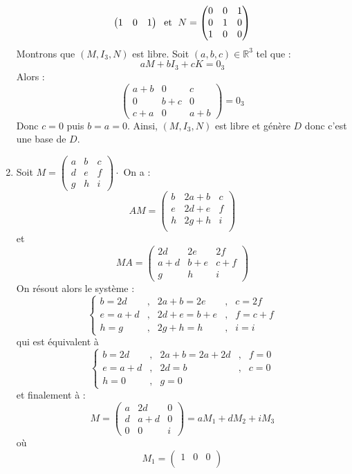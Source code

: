 \documentclass[a4paper,10pt]{report}
\begin{document}
\begin{enumerate}
$$\begin{pmatrix}
1 & 0 & 1
\end{pmatrix} \; \hbox{ et } \; N = \begin{pmatrix}
0 & 0 & 1 \\
0 & 1 & 0 \\
1 & 0 & 0 
\end{pmatrix}$$
Montrons que $(M,I_3,N)$ est libre. Soit $(a,b,c) \in \mathbb{R}^3$ tel que :
$$ a M + b I_3 + c K = 0_3$$
Alors :
$$ \begin{pmatrix}
a+b & 0 & c \\
0 & b+c & 0 \\
c+a & 0& a+b 
\end{pmatrix} = 0_3 $$
Donc $c=0$ puis $b=a=0$. Ainsi, $(M,I_3,N)$ est libre et génère $D$ donc c'est une base de $D$.
\item Soit $M = \begin{pmatrix}
a & b & c \\
d & e & f \\
g & h & i 
\end{pmatrix} \cdot$ On a :
$$ AM = \begin{pmatrix}
b & 2a+b & c\\
e & 2d+e & f \\
h & 2g+h & i \\
\end{pmatrix}$$
et
$$ MA  =\begin{pmatrix}
2d& 2e& 2f \\
a+d & b+e & c+f \\
g & h & i 
\end{pmatrix}$$
On résout alors le système :
$$ \left\lbrace \begin{array}{lclcl}
b= 2d &,& 2a+b=2e &,& c=2f\\
e=a+d &,& 2d+e=b+e &,& f=c+f \\
h=g &,& 2g+h=h&,& i=i
\end{array}\right.$$
qui est équivalent à 
$$ \left\lbrace \begin{array}{lclcl}
b= 2d &,& 2a+b=2a+2d &,& f=0\\
e=a+d &,& 2d=b &,& c=0 \\
h=0 &,& g=0&& 
\end{array}\right.$$
et finalement à :
$$ M = \begin{pmatrix}
a & 2d & 0 \\
d & a+d & 0 \\
0 & 0 & i
\end{pmatrix} = a M_1+ d M_2+i M_3$$
où 
$$ M_1 = \begin{pmatrix}
1 & 0 & 0 \\

\end{pmatrix}$$
\end{enumerate}
\end{document}
